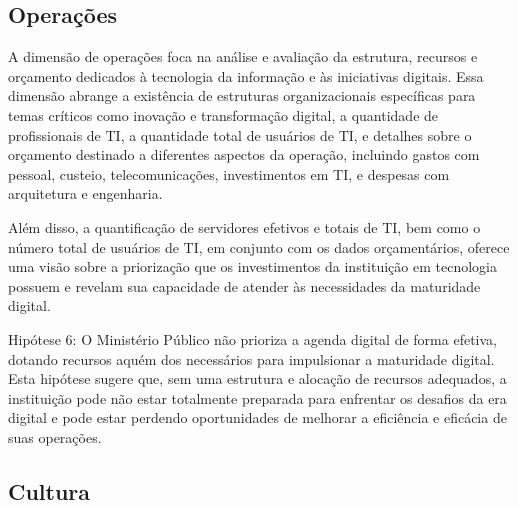 \subsection{Operações}

A dimensão de operações foca na análise e avaliação da estrutura, recursos e orçamento dedicados à tecnologia da informação e às iniciativas digitais. Essa dimensão abrange a existência de estruturas organizacionais específicas para temas críticos como inovação e transformação digital, a quantidade de profissionais de TI, a quantidade total de usuários de TI, e detalhes sobre o orçamento destinado a diferentes aspectos da operação, incluindo gastos com pessoal, custeio, telecomunicações, investimentos em TI, e despesas com arquitetura e engenharia.

Além disso, a quantificação de servidores efetivos e totais de TI, bem como o número total de usuários de TI, em conjunto com os dados orçamentários, oferece uma visão sobre a priorização que os investimentos da instituição em tecnologia possuem e revelam sua capacidade de atender às necessidades da maturidade digital.

Hipótese 6: O Ministério Público não prioriza a agenda digital de forma efetiva, dotando recursos aquém dos necessários para impulsionar a maturidade digital. Esta hipótese sugere que, sem uma estrutura e alocação de recursos adequados, a instituição pode não estar totalmente preparada para enfrentar os desafios da era digital e pode estar perdendo oportunidades de melhorar a eficiência e eficácia de suas operações.

\subsection{Cultura}

